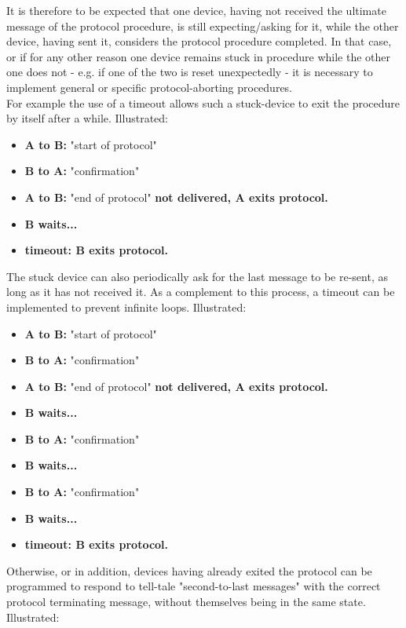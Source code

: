 It is therefore to be expected that one device, having not received the ultimate message of the protocol procedure, is still expecting/asking for it, while the other device, having sent it, considers the protocol procedure completed.
In that case, or if for any other reason one device remains stuck in procedure while the other one does not - e.g. if one of the two is reset unexpectedly - it is necessary to implement general or specific protocol-aborting procedures.\\

For example the use of a timeout allows such a stuck-device to exit the procedure by itself after a while. Illustrated:

\begin{itemize}
\item[] \textbf{A to B:} "start of protocol"
\item[] \textbf{B to A:} "confirmation"
\item[] \textbf{A to B:} "end of protocol" \textbf{not delivered, A exits protocol.}
\item[] \textbf{B waits...}
\item[] \textbf{timeout: B exits protocol.}
\end{itemize}

The stuck device can also periodically ask for the last message to be re-sent, as long as it has not received it. As a complement to this process, a timeout can be implemented to prevent infinite loops. Illustrated:

\begin{itemize}
\item[] \textbf{A to B:} "start of protocol"
\item[] \textbf{B to A:} "confirmation"
\item[] \textbf{A to B:} "end of protocol" \textbf{not delivered, A exits protocol.}
\item[] \textbf{B waits...}
\item[] \textbf{B to A:} "confirmation"
\item[] \textbf{B waits...}
\item[] \textbf{B to A:} "confirmation"
\item[] \textbf{B waits...}
\item[] \textbf{timeout: B exits protocol.}
\end{itemize}

Otherwise, or in addition, devices having already exited the protocol can be programmed to respond to tell-tale "second-to-last messages" with the correct protocol terminating message, without themselves being in the same state. Illustrated:

